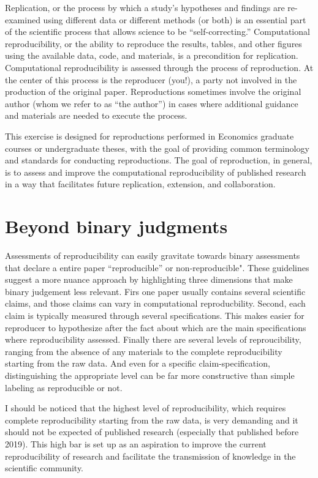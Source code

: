 \documentclass[]{book}
\begin{document}
Replication, or the process by which a study's hypotheses and findings are re-examined using different data or different methods (or both) \citep{King95} is an essential part of the scientific process that allows science to be ``self-correcting.'' Computational reproducibility, or the ability to reproduce the results, tables, and other figures using the available data, code, and materials, is a precondition for replication. Computational reproducibility is assessed through the process of reproduction. At the center of this process is the reproducer (you!), a party not involved in the production of the original paper. Reproductions sometimes involve the original author (whom we refer to as ``the author'') in cases where additional guidance and materials are needed to execute the process.

This exercise is designed for reproductions performed in Economics graduate courses or undergraduate theses, with the goal of providing common terminology and standards for conducting reproductions. The goal of reproduction, in general, is to assess and improve the computational reproducibility of published research in a way that facilitates future replication, extension, and collaboration.

\hypertarget{beyond-binary-judgments}{%
\section{Beyond binary judgments}\label{beyond-binary-judgments}}

Assessments of reproducibility can easily gravitate towards binary assessments that declare a entire paper ``reproducible'' or non-reproducible". These guidelines suggest a more nuance approach by highlighting three dimensions that make binary judgement less relevant. Firs one paper usually contains several scientific claims, and those claims can vary in computational reproducbility. Second, each claim is typically measured through several specifications. This makes easier for reproducer to hypothesize after the fact about which are the main specifications where reproducibility assessed. Finally there are several levels of reproucibility, ranging from the absence of any materials to the complete reproducibility starting from the raw data. And even for a specific claim-specification, distinguishing the appropriate level can be far more constructive than simple labeling as reproducible or not.

I should be noticed that the highest level of reproducibility, which requires complete reproducibility starting from the raw data, is very demanding and it should not be expected of published research (especially that published before 2019). This high bar is set up as an aspiration to improve the current reproducibility of research and facilitate the transmission of knowledge in the scientific community.
\end{document}
